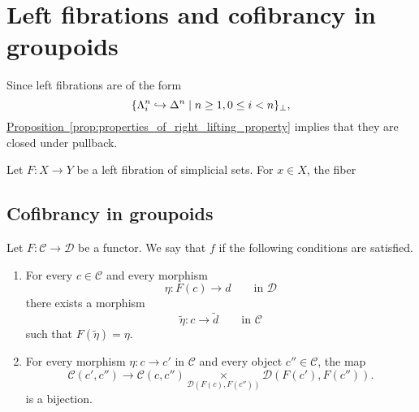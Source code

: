 \documentclass[main.tex]{subfiles}
\begin{document}
\section{Left fibrations and cofibrancy in groupoids}
\label{sec:left_fibrations_and_cofibrancy_in_groupoids}

Since left fibrations are of the form
\begin{equation*}
  \{\Lambda^{n}_{i} \hookrightarrow \Delta^{n} \mid n \geq 1, 0 \leq i < n\}_{\perp},
\end{equation*}
\hyperref[prop:properties_of_right_lifting_property]{Proposition~\ref*{prop:properties_of_right_lifting_property}} implies that they are closed under pullback.

Let $F\colon X \to Y$ be a left fibration of simplicial sets. For $x \in X$, the fiber

\subsection{Cofibrancy in groupoids}
\label{ssc:cofibrancy_in_groupoids}

\begin{definition}
  \label{def:cofibrant_in_groupoids}
  Let $F\colon \mathcal{C} \to \mathcal{D}$ be a functor. We say that $f$  if the following conditions are satisfied.
  \begin{enumerate}
    \item For every $c \in \mathcal{C}$ and every morphism
      \begin{equation*}
        \eta\colon F(c) \to d \qquad\text{in }\mathcal{D}
      \end{equation*}
      there exists a morphism
      \begin{equation*}
        \tilde{\eta}\colon c \to \tilde{d}\qquad\text{in }\mathcal{C}
      \end{equation*}
      such that $F(\tilde{\eta}) = \eta$.

    \item For every morphism $\eta\colon c \to c'$ in $\mathcal{C}$ and every object $c'' \in \mathcal{C}$, the map
      \begin{equation*}
        \mathcal{C}(c', c'') \to\mathcal{C}(c, c'') \underset{\mathcal{D}(F(c), F(c''))}{\times}\mathcal{D}(F(c'), F(c'')).
      \end{equation*}
      is a bijection.
  \end{enumerate}
\end{definition}
\end{document}
